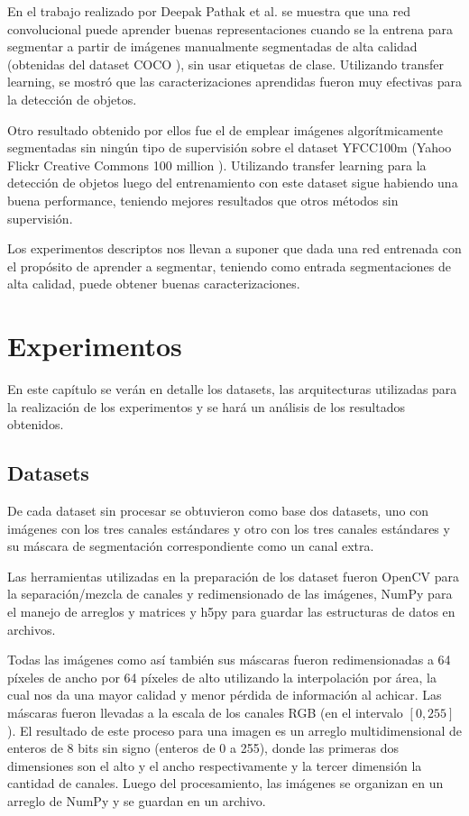 \documentclass[spanish]{report}
\begin{document}
En el trabajo realizado por Deepak Pathak et al. \cite{learning_features} se muestra que una red convolucional puede aprender buenas representaciones cuando se la entrena para segmentar a partir de imágenes manualmente segmentadas de alta calidad (obtenidas del dataset COCO \cite{coco}), sin usar etiquetas de clase. Utilizando transfer learning, se mostró que las caracterizaciones aprendidas fueron muy efectivas para la detección de objetos.

Otro resultado obtenido por ellos fue el de emplear imágenes algorítmicamente segmentadas sin ningún tipo de supervisión sobre el dataset YFCC100m (Yahoo Flickr Creative Commons 100 million \cite{yfcc100m}). Utilizando transfer learning para la detección de objetos luego del entrenamiento con este dataset sigue habiendo una buena performance, teniendo mejores resultados que otros métodos sin supervisión.

Los experimentos descriptos nos llevan a suponer que dada una red entrenada con el propósito de aprender a segmentar, teniendo como entrada segmentaciones de alta calidad, puede obtener buenas caracterizaciones. 

\chapter{Experimentos}

En este capítulo se verán en detalle los datasets, las arquitecturas utilizadas para la realización de los experimentos y se hará un análisis de los resultados obtenidos.

\section{Datasets}


De cada dataset sin procesar se obtuvieron como base dos datasets, uno con imágenes con los tres canales estándares y otro con los tres canales estándares y su máscara de segmentación correspondiente como un canal extra.

Las herramientas utilizadas en la preparación de los dataset fueron OpenCV \cite{opencv_library} para la separación/mezcla de canales y redimensionado de las imágenes, NumPy \cite{numpy} para el manejo de arreglos y matrices y h5py \cite{h5py} para guardar las estructuras de datos en archivos.

Todas las imágenes como así también sus máscaras fueron redimensionadas a 64 píxeles de ancho por 64 píxeles de alto utilizando la interpolación por área, la cual nos da una mayor calidad y menor pérdida de información al achicar. Las máscaras fueron llevadas a la escala de los canales RGB (en el intervalo $[0, 255]$). El resultado de este proceso para una imagen es un arreglo multidimensional de enteros de 8 bits sin signo (enteros de 0 a 255), donde las primeras dos dimensiones son el alto y el ancho respectivamente y la tercer dimensión la cantidad de canales. Luego del procesamiento, las imágenes se organizan en un arreglo de NumPy y se guardan en un archivo.
\end{document}
